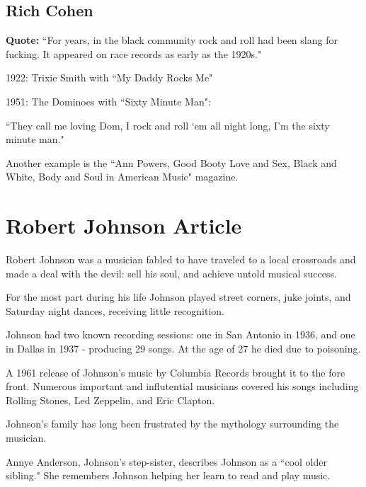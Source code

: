\documentclass[12pt, a4paper, twoside, openright, titlepage]{book}
\begin{document}
\subsection{Rich Cohen}

\textbf{Quote:} ``For years, in the black community rock and roll had been slang for fucking. It appeared on race records as early as the 1920s."

\begin{eg}{}{}
    1922: Trixie Smith with ``My Daddy Rocks Me"
\end{eg}

\begin{eg}{}{}
    1951: The Dominoes with ``Sixty Minute Man":


    ``They call me loving Dom, I rock and roll `em all night long, I'm the sixty minute man."
\end{eg}

Another example is the ``Ann Powers, Good Booty Love and Sex, Black and White, Body and Soul in American Music" magazine.



\section{Robert Johnson Article}

\begin{rmk}{}{}
    Robert Johnson was a musician fabled to have traveled to a local crossroads and made a deal with the devil: sell his soul, and achieve untold musical success.
\end{rmk}

For the most part during his life Johnson played street corners, juke joints, and Saturday night dances, receiving little recognition. 

Johnson had two known recording sessions: one in San Antonio in 1936, and one in Dallas in 1937 - producing 29 songs. At the age of 27 he died due to poisoning.

\begin{note}{}{}
    A 1961 release of Johnson's music by Columbia Records brought it to the fore front. Numerous important and influtential musicians covered his songs including Rolling Stones, Led Zeppelin, and Eric Clapton.
\end{note}

Johnson's family has long been frustrated by the mythology surrounding the musician.

Annye Anderson, Johnson's step-sister, describes Johnson as a ``cool older sibling." She remembers Johnson helping her learn to read and play music.
\end{document}
